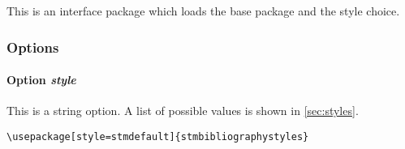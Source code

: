 This is an interface package which loads the base package and the style choice.




\subsubsection{Options}
\label{sec:usage:preamble:wholepackage:options}





\paragraph{Option \protect\textit{style}} 
\label{sec:usage:preamble:wholepackage:options:style}


This is a string option. A list of possible values is shown in \cref{sec:styles}.

\begin{verbatim}
\usepackage[style=stmdefault]{stmbibliographystyles}
\end{verbatim}

